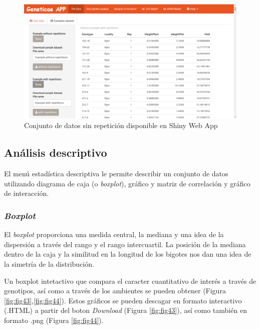 \begin{figure}[H]
	\begin{center}
		\includegraphics[width=17cm]{./Graficos/Exampledatasets_withrep.png}
	\end{center}
	\caption{Conjunto de datos sin repetición disponible en Shiny Web App}
	\label{fig:fig42}
\end{figure}

\subsection{Análisis descriptivo}

El menú estadística descriptiva le permite describir un conjunto de datos utilizando diagrama de caja (o \emph{boxplot}), gráfico y matriz de correlación y gráfico de interacción.

\subsubsection{\emph{Boxplot}}
El \emph{boxplot} proporciona una medida central, la mediana y una idea de la dispersión a través del rango y el rango intercuartil. La posición de la mediana dentro de la caja y la similitud en la longitud de los bigotes nos dan una idea de la simetría de la distribución. 

Un boxplot intetactivo que compara el caracter cuantitativo de interés a través de genotipos, así como a través de los ambientes se pueden obtener (Figura \ref{fig:fig43},\ref{fig:fig44}).  Estos gráficos se pueden descagar en formato interactivo (.HTML) a partir del boton \emph{Download} (Figura \ref{fig:fig43}), así como también en formato .png (Figura \ref{fig:fig44}).

